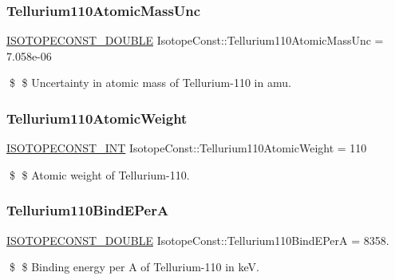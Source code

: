 \subsubsection{\texorpdfstring{Tellurium110\+Atomic\+Mass\+Unc}{Tellurium110AtomicMassUnc}}
{\footnotesize\ttfamily \mbox{\hyperlink{group___isotope_const-_macros_ga8f45a7272ce02c0b4c65c44636ed719a}{I\+S\+O\+T\+O\+P\+E\+C\+O\+N\+S\+T\+\_\+\+D\+O\+U\+B\+LE}} Isotope\+Const\+::\+Tellurium110\+Atomic\+Mass\+Unc = 7.\+058e-\/06}

\$ \$ Uncertainty in atomic mass of Tellurium-\/110 in amu. \mbox{\label{group___isotope_const-_tellurium-_te110_ga8fc372bff0a86bc6350757b571a3706d}} 
\subsubsection{\texorpdfstring{Tellurium110\+Atomic\+Weight}{Tellurium110AtomicWeight}}
{\footnotesize\ttfamily \mbox{\hyperlink{group___isotope_const-_macros_ga5f18360b3e99483a35c32d789e62621c}{I\+S\+O\+T\+O\+P\+E\+C\+O\+N\+S\+T\+\_\+\+I\+NT}} Isotope\+Const\+::\+Tellurium110\+Atomic\+Weight = 110}

\$ \$ Atomic weight of Tellurium-\/110. \mbox{\label{group___isotope_const-_tellurium-_te110_ga8d4cde31ad9630471e9764748f29382e}} 
\subsubsection{\texorpdfstring{Tellurium110\+Bind\+E\+PerA}{Tellurium110BindEPerA}}
{\footnotesize\ttfamily \mbox{\hyperlink{group___isotope_const-_macros_ga8f45a7272ce02c0b4c65c44636ed719a}{I\+S\+O\+T\+O\+P\+E\+C\+O\+N\+S\+T\+\_\+\+D\+O\+U\+B\+LE}} Isotope\+Const\+::\+Tellurium110\+Bind\+E\+PerA = 8358.}

\$ \$ Binding energy per A of Tellurium-\/110 in keV. \mbox{\label{group___isotope_const-_tellurium-_te110_ga7dc6442fbca369e3f116ccc0f2772512}} 
